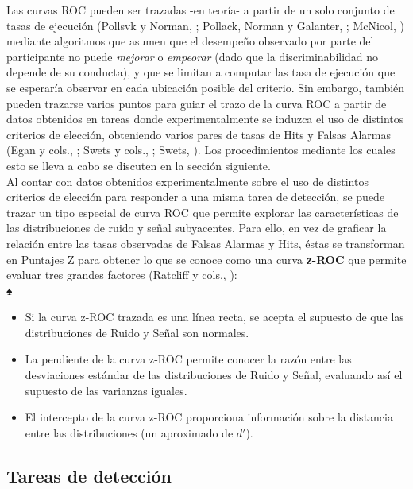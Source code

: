 Las curvas ROC pueden ser trazadas -en teoría- a partir de un solo conjunto de tasas de ejecución (Pollsvk y Norman, \citeyear{Pollack1964a}; Pollack, Norman y Galanter, \citeyear{Pollack1964b}; McNicol, \citeyear{McNicol2}) mediante algoritmos que asumen que el desempeño observado por parte del participante no puede \textit{mejorar} o \textit{empeorar} (dado que la discriminabilidad no depende de su conducta), y que se limitan a computar las tasa de ejecución que se esperaría observar en cada ubicación posible del criterio. Sin embargo, también pueden trazarse varios puntos para guiar el trazo de la curva ROC a partir de datos obtenidos en tareas donde experimentalmente se induzca el uso de distintos criterios de elección, obteniendo varios pares de tasas de Hits y Falsas Alarmas (Egan y cols., \citeyear{Egan1959}; Swets y cols., \citeyear{Swets1961}; Swets, \citeyear{Swets1986}). Los procedimientos mediante los cuales esto se lleva a cabo se discuten en la sección siguiente.\\

Al contar con datos obtenidos experimentalmente sobre el uso de distintos criterios de elección para responder a una misma tarea de detección, se puede trazar un tipo especial de curva ROC que permite explorar las características de las distribuciones de ruido y señal subyacentes. Para ello, en vez de graficar la relación entre las tasas observadas de Falsas Alarmas y Hits, éstas se transforman en Puntajes Z para obtener lo que se conoce como una curva \textbf{z-ROC} que permite evaluar tres grandes factores (Ratcliff y cols., \citeyear{Ratcliff1992}):\\♠

\begin{itemize}
\item Si la curva z-ROC trazada es una línea recta, se acepta el supuesto de que las distribuciones de Ruido y Señal son normales.
\item La pendiente de la curva z-ROC permite conocer la razón entre las desviaciones estándar de las distribuciones de Ruido y Señal, evaluando así el supuesto de las varianzas iguales.
\item El intercepto de la curva z-ROC proporciona información sobre la distancia entre las distribuciones (un aproximado de $d'$).
\end{itemize}



\subsection{Tareas de detección}

